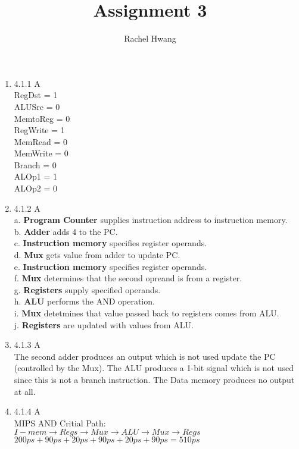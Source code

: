 \documentclass[12pt]{article}
\title{Assignment 3}
\author{Rachel Hwang}
\begin{document}
\maketitle

\begin{enumerate}
\item 4.1.1 A \\
RegDst = 1 \\
ALUSrc = 0 \\
MemtoReg = 0 \\
RegWrite = 1 \\
MemRead = 0 \\
MemWrite = 0 \\
Branch = 0 \\
ALOp1 = 1 \\
ALOp2 = 0 
\\

\item 4.1.2 A \\
a. \textbf{Program Counter} supplies instruction address to instruction memory. \\
b. \textbf{Adder} adds 4 to the PC. \\
c. \textbf{Instruction memory} specifies register operands. \\
d. \textbf{Mux} gets value from adder to update PC. \\
e. \textbf{Instruction memory} specifies register operands. \\
f. \textbf{Mux} determines that the second opreand is from a register. \\
g. \textbf{Registers} supply specified operands. \\
h. \textbf{ALU} performs the AND operation. \\
i. \textbf{Mux} detetmines that value passed back to registers comes from ALU. \\
j. \textbf{Registers} are updated with values from ALU.
\\

\item 4.1.3 A \\
The second adder produces an output which is not used update the PC (controlled by the Mux). The ALU produces a 1-bit signal which is not used since this is not a branch instruction. The Data memory produces no output at all.
\\

\item 4.1.4 A \\
MIPS AND Critial Path: \\
$I-mem\rightarrow Regs\rightarrow Mux\rightarrow ALU \rightarrow Mux \rightarrow Regs$ \\
$200ps+90ps+20ps+90ps+20ps+90ps=510ps$
\\


\end{enumerate}
\end{document}
